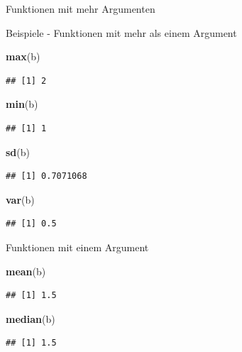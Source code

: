 \documentclass[ignorenonframetext,]{beamer}
\newenvironment{Shaded}{\begin{snugshade}}{\end{snugshade}}
\newcommand{\KeywordTok}[1]{\textcolor[rgb]{0.13,0.29,0.53}{\textbf{#1}}}
\newcommand{\NormalTok}[1]{#1}
\begin{document}
\begin{frame}[fragile]{Funktionen mit mehr Argumenten}
\begin{block}{Beispiele - Funktionen mit mehr als einem Argument}
\begin{Shaded}
\begin{Highlighting}[]
\KeywordTok{max}\NormalTok{(b)}
\end{Highlighting}
\end{Shaded}

\begin{verbatim}
## [1] 2
\end{verbatim}

\begin{Shaded}
\begin{Highlighting}[]
\KeywordTok{min}\NormalTok{(b)}
\end{Highlighting}
\end{Shaded}

\begin{verbatim}
## [1] 1
\end{verbatim}

\begin{Shaded}
\begin{Highlighting}[]
\KeywordTok{sd}\NormalTok{(b)}
\end{Highlighting}
\end{Shaded}

\begin{verbatim}
## [1] 0.7071068
\end{verbatim}

\begin{Shaded}
\begin{Highlighting}[]
\KeywordTok{var}\NormalTok{(b)}
\end{Highlighting}
\end{Shaded}

\begin{verbatim}
## [1] 0.5
\end{verbatim}

\end{block}

\begin{block}{Funktionen mit einem Argument}

\begin{Shaded}
\begin{Highlighting}[]
\KeywordTok{mean}\NormalTok{(b)}
\end{Highlighting}
\end{Shaded}

\begin{verbatim}
## [1] 1.5
\end{verbatim}

\begin{Shaded}
\begin{Highlighting}[]
\KeywordTok{median}\NormalTok{(b)}
\end{Highlighting}
\end{Shaded}

\begin{verbatim}
## [1] 1.5
\end{verbatim}

\end{block}

\end{frame}
\end{document}
